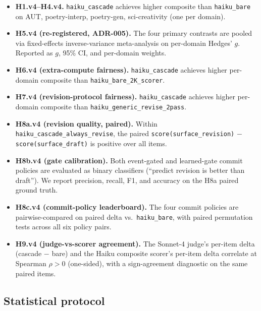 \begin{itemize}[leftmargin=1.4em]
\item \textbf{H1.v4--H4.v4.} \texttt{haiku\_cascade} achieves higher composite than \texttt{haiku\_bare} on AUT, poetry-interp, poetry-gen, sci-creativity (one per domain).
\item \textbf{H5.v4 (re-registered, ADR-005).} The four primary contrasts are pooled via fixed-effects inverse-variance meta-analysis on per-domain Hedges' $g$. Reported as $g$, 95\% CI, and per-domain weights.
\item \textbf{H6.v4 (extra-compute fairness).} \texttt{haiku\_cascade} achieves higher per-domain composite than \texttt{haiku\_bare\_2K\_scorer}.
\item \textbf{H7.v4 (revision-protocol fairness).} \texttt{haiku\_cascade} achieves higher per-domain composite than \texttt{haiku\_generic\_revise\_2pass}.
\item \textbf{H8a.v4 (revision quality, paired).} Within \texttt{haiku\_cascade\_always\_revise}, the paired \texttt{score(surface\_revision)} $-$ \texttt{score(surface\_draft)} is positive over all items.
\item \textbf{H8b.v4 (gate calibration).} Both event-gated and learned-gate commit policies are evaluated as binary classifiers (``predict revision is better than draft''). We report precision, recall, F1, and accuracy on the H8a paired ground truth.
\item \textbf{H8c.v4 (commit-policy leaderboard).} The four commit policies are pairwise-compared on paired delta vs.\ \texttt{haiku\_bare}, with paired permutation tests across all six policy pairs.
\item \textbf{H9.v4 (judge-vs-scorer agreement).} The Sonnet-4 judge's per-item delta (cascade $-$ bare) and the Haiku composite scorer's per-item delta correlate at Spearman $\rho > 0$ (one-sided), with a sign-agreement diagnostic on the same paired items.
\end{itemize}

\subsection{Statistical protocol}

